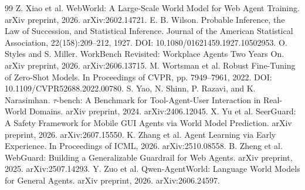 \documentclass[11pt]{article}
\begin{document}
\begin{thebibliography}{99}
 Z. Xiao et al. WebWorld: A Large-Scale World Model for Web Agent Training. arXiv preprint, 2026. arXiv:2602.14721.
 E. B. Wilson. Probable Inference, the Law of Succession, and Statistical Inference. Journal of the American Statistical Association, 22(158):209--212, 1927. DOI: 10.1080/01621459.1927.10502953.
 O. Styles and S. Miller. WorkBench Revisited: Workplace Agents Two Years On. arXiv preprint, 2026. arXiv:2606.13715.
 M. Wortsman et al. Robust Fine-Tuning of Zero-Shot Models. In Proceedings of CVPR, pp. 7949--7961, 2022. DOI: 10.1109/CVPR52688.2022.00780.
 S. Yao, N. Shinn, P. Razavi, and K. Narasimhan. $\tau$-bench: A Benchmark for Tool-Agent-User Interaction in Real-World Domains. arXiv preprint, 2024. arXiv:2406.12045.
 X. Yu et al. SeerGuard: A Safety Framework for Mobile GUI Agents via World Model Prediction. arXiv preprint, 2026. arXiv:2607.15550.
 K. Zhang et al. Agent Learning via Early Experience. In Proceedings of ICML, 2026. arXiv:2510.08558.
 B. Zheng et al. WebGuard: Building a Generalizable Guardrail for Web Agents. arXiv preprint, 2025. arXiv:2507.14293.
 Y. Zuo et al. Qwen-AgentWorld: Language World Models for General Agents. arXiv preprint, 2026. arXiv:2606.24597.
\end{thebibliography}
\end{document}
